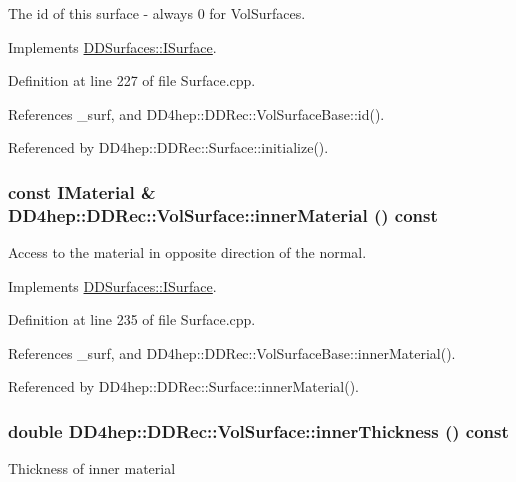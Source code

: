 The id of this surface -\/ always 0 for VolSurfaces. 

Implements \hyperlink{class_d_d_surfaces_1_1_i_surface_aaf7bf967d4a0652c620ec9754a2b37c1}{DDSurfaces::ISurface}.

Definition at line 227 of file Surface.cpp.

References \_\-surf, and DD4hep::DDRec::VolSurfaceBase::id().

Referenced by DD4hep::DDRec::Surface::initialize().\hypertarget{class_d_d4hep_1_1_d_d_rec_1_1_vol_surface_a9f25046b9bac451dd240aa7b020d704a}{
\subsubsection[{innerMaterial}]{\setlength{\rightskip}{0pt plus 5cm}const {\bf IMaterial} \& DD4hep::DDRec::VolSurface::innerMaterial () const}}
\label{class_d_d4hep_1_1_d_d_rec_1_1_vol_surface_a9f25046b9bac451dd240aa7b020d704a}


Access to the material in opposite direction of the normal. 

Implements \hyperlink{class_d_d_surfaces_1_1_i_surface_a18942d2f0ea7478506765a50fa44d5e3}{DDSurfaces::ISurface}.

Definition at line 235 of file Surface.cpp.

References \_\-surf, and DD4hep::DDRec::VolSurfaceBase::innerMaterial().

Referenced by DD4hep::DDRec::Surface::innerMaterial().\hypertarget{class_d_d4hep_1_1_d_d_rec_1_1_vol_surface_a21b75812c52fa387e58ce0ac7a25aaca}{
\subsubsection[{innerThickness}]{\setlength{\rightskip}{0pt plus 5cm}double DD4hep::DDRec::VolSurface::innerThickness () const}}
\label{class_d_d4hep_1_1_d_d_rec_1_1_vol_surface_a21b75812c52fa387e58ce0ac7a25aaca}
Thickness of inner material 

